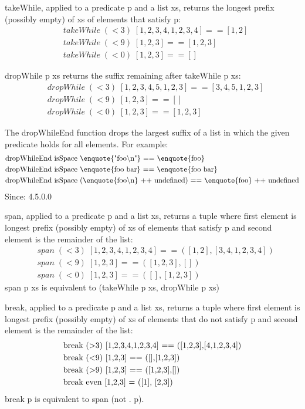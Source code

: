 takeWhile, applied to a predicate p and a list xs, returns the longest prefix (possibly empty) of xs of elements that satisfy p:
\begin{align*}
	&takeWhile\; (< 3)\; [1,2,3,4,1,2,3,4] == [1,2]\\
	&takeWhile\; (< 9)\; [1,2,3] == [1,2,3]\\
	&takeWhile\; (< 0)\; [1,2,3] == []
\end{align*}

dropWhile p xs returns the suffix remaining after takeWhile p xs:
\begin{align*}
	&dropWhile\; (< 3)\; [1,2,3,4,5,1,2,3] == [3,4,5,1,2,3]\\
	&dropWhile\; (< 9)\; [1,2,3] == []\\
	&dropWhile\; (< 0)\; [1,2,3] == [1,2,3]
\end{align*}

The dropWhileEnd function drops the largest suffix of a list in which the given predicate holds for all elements. For example:
\begin{align*}
	&\text{dropWhileEnd isSpace \enquote{"foo\textbackslash n"} == \enquote{foo}}\\
	&\text{dropWhileEnd isSpace \enquote{foo bar} == \enquote{foo bar}}\\
	&\text{dropWhileEnd isSpace (\enquote{foo\textbackslash n} ++ undefined) == \enquote{foo} ++ undefined}
\end{align*}
Since: 4.5.0.0

span, applied to a predicate p and a list xs, returns a tuple where first element is longest prefix (possibly empty) of xs of elements that satisfy p and second element is the remainder of the list:
\begin{align*}
	&span\; (< 3)\; [1,2,3,4,1,2,3,4] == ([1,2],[3,4,1,2,3,4])\\
	&span\; (< 9)\; [1,2,3] == ([1,2,3],[])\\
	&span\; (< 0)\; [1,2,3] == ([],[1,2,3])
\end{align*}
span p xs is equivalent to (takeWhile p xs, dropWhile p xs)

break, applied to a predicate p and a list xs, returns a tuple where first element is longest prefix (possibly empty) of xs of elements that do not satisfy p and second element is the remainder of the list:
\begin{align*}
	&\text{break (\textgreater 3) [1,2,3,4,1,2,3,4] == ([1,2,3],[4,1,2,3,4])}\\
	&\text{break (\textless 9) [1,2,3] == ([],[1,2,3])}\\
	&\text{break (\textgreater 9) [1,2,3] == ([1,2,3],[])}\\
	&\text{break even [1,2,3] = ([1], [2,3])}
\end{align*}
break p is equivalent to span (not . p).

